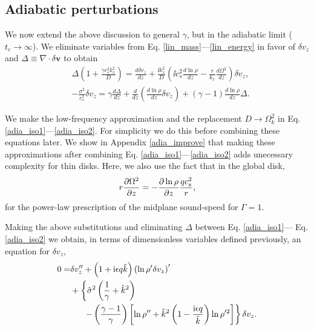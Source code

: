 \subsection{Adiabatic perturbations}\label{analytic_adia}
We now extend the above discussion to general $\gamma$, but in the
adiabatic limit ($t_c\to\infty$). We eliminate variables from 
Eq. \ref{lin_mass}---\ref{lin_energy} in favor of $\delta v_z$ 
and $\Delta \equiv \nabla\cdot\delta\bm{v}$ to obtain
\begin{align}
  &\Delta\left(1 + \frac{\gamma c_s^2 k_x^2}{D}\right) = \frac{d\delta
    v_z}{dz} + \frac{\ii k_x^2}{D}\left(\ii c_s^2 \frac{d\ln\rho}{dz}
    - \frac{r}{k_x}\frac{d\Omega^2}{dz}\right)\delta v_z,\label{adia_iso1}\\
  & -\frac{\sigma^2}{c_s^2}\delta v_z = \gamma \frac{d\Delta}{dz} +
  \frac{d}{dz}\left(\frac{d\ln\rho}{dz}\delta v_z\right) +
  \left(\gamma-1\right)\frac{d\ln\rho}{dz} \Delta.\label{adia_iso2}
\end{align}

We make the low-frequency approximation and the replacement 
$D\to \Omega_k^2$ in Eq. \ref{adia_iso1}---\ref{adia_iso2}. For
simplicity we do this before combining these equations later. We  
show in Appendix \ref{adia_improve} that making these approximations
after combining  Eq. \ref{adia_iso1}---\ref{adia_iso2} adds unecessary
complexity for thin disks. Here, we also use the fact that in the
global disk, 
\begin{align}
  r\frac{\partial \Omega^2}{\partial z} = -\frac{\partial \ln\rho}{\partial z} \frac{qc_s^2}{r},
\end{align}
for the power-law prescription of the midplane sound-speed for
$\Gamma=1$.  

Making the above substitutions and eliminating $\Delta$ between Eq. \ref{adia_iso1}---
Eq. \ref{adia_iso2} we obtain, in terms of dimensionless variables defined
previously, an equation for $\delta v_z$, 
\begin{align}
  0 =& \delta v_z^{\prime\prime} + \left(1 + \mathrm{i} \epsilon q
    \hat{k}\right)\left(\ln\rho^{\prime}\delta v_z\right)^\prime\notag\\
  &+\left\{\hat{\sigma}^2\left(\frac{1}{\gamma}+\hat{k}^2\right)\right.\notag\\
  &\phantom{0=}\left.-\left(\frac{\gamma-1}{\gamma}\right)\left[\ln\rho^{\prime\prime}+\hat{k}^2\left(1-\frac{\mathrm{i}\epsilon  
          q}{\hat{k}}\right)\ln\rho^{\prime 2}\right]\right\}\delta v_z.\label{adia_iso3}
\end{align}

